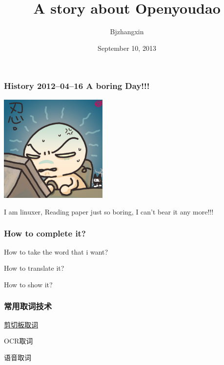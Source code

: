 \documentclass[10pt]{beamer}
\author[NetEase]{Bjzhangxin}
\title{A story about Openyoudao}
\date{September 10, 2013}
\begin{document}
\begin{CJK*}{UTF8}{song} %
\begin{frame}[plain]
  \titlepage
\end{frame}

\begin{frame}
  \frametitle{\Large{History 2012--04--16 A boring Day!!!}}

\begin{center} 
  \includegraphics[width=0.4\textwidth]{pic1.jpg}
\end{center}
\medskip
\quad
\qquad

I am linuxer, Reading paper just so boring, I can't bear it any more!!!
\end{frame}
\begin{frame}
  \frametitle{\Large{How to complete it?}}
\begin{itemize}
 \LARGE{\item How to take the word that i want?
  \item How to translate it?
  \item How to show it?}
\end{itemize}
\end{frame}
\begin{frame}
  \frametitle{\Large{常用取词技术}}
\begin{itemize}
 \LARGE{\item \href{http://nullege.com/codes/show/src@p@y@python-xlib-HEAD@trunk@examples@record_demo.py/86/Xlib.display.Display.record_create_context}{剪切板取词}
  \item OCR取词
  \item 语音取词}
\end{itemize}
\end{frame}


\end{CJK*}
\end{document}
